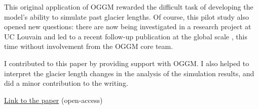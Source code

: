 This original application of OGGM rewarded the difficult task
of developing the model’s ability to simulate past glacier lengths. Of course,
this pilot study also opened new questions: there are now being investigated in a research project at UC Louvain
and led to a recent follow-up publication at the global scale \citep{Parkes2020}, this time without
involvement from the OGGM core team.

I contributed to this paper by providing support with OGGM. I also helped to interpret the glacier
length changes in the analysis of the simulation results, and did a minor contribution to the writing.

\href{https://doi.org/10.5194/cp-14-1119-2018}{Link to the paper} (open-access)


%


